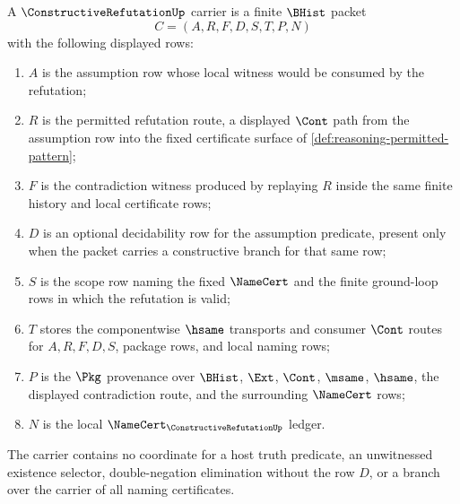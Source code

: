 \begin{definition}
\label{def:constructive-refutation-carrier}
A $\ConstructiveRefutationUp$ carrier is a finite $\BHist$ packet
$$
C=(A,R,F,D,S,T,P,N)
$$
with the following displayed rows:
\begin{enumerate}
\item $A$ is the assumption row whose local witness would be consumed by the refutation;
\item $R$ is the permitted refutation route, a displayed $\Cont$ path from the assumption row into the fixed certificate surface of \autoref{def:reasoning-permitted-pattern};
\item $F$ is the contradiction witness produced by replaying $R$ inside the same finite history and local certificate rows;
\item $D$ is an optional decidability row for the assumption predicate, present only when the packet carries a constructive branch for that same row;
\item $S$ is the scope row naming the fixed $\NameCert$ and the finite ground-loop rows in which the refutation is valid;
\item $T$ stores the componentwise $\hsame$ transports and consumer $\Cont$ routes for $A,R,F,D,S$, package rows, and local naming rows;
\item $P$ is the $\Pkg$ provenance over $\BHist$, $\Ext$, $\Cont$, $\msame$, $\hsame$, the displayed contradiction route, and the surrounding $\NameCert$ rows;
\item $N$ is the local $\NameCert_{\ConstructiveRefutationUp}$ ledger.
\end{enumerate}
The carrier contains no coordinate for a host truth predicate, an unwitnessed existence selector, double-negation elimination without the row $D$, or a branch over the carrier of all naming certificates.
\end{definition}

